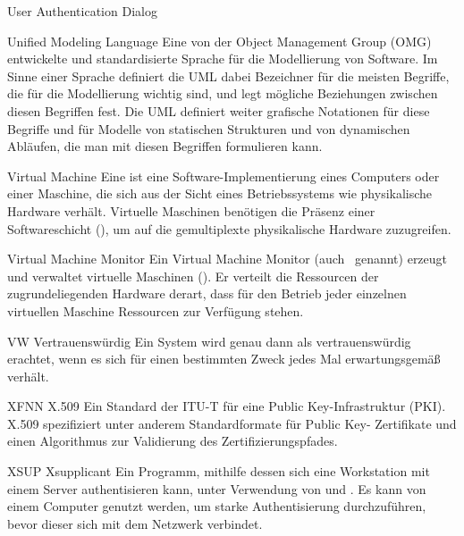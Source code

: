      {User Authentication Dialog}

	{Unified Modeling Language}
	{Eine von der Object Management Group (OMG) entwickelte und 
	 standardisierte Sprache f\"ur die Modellierung von Software. Im Sinne
	 einer Sprache definiert die UML dabei Bezeichner f\"ur die meisten 
	 Begriffe, die f\"ur die Modellierung wichtig sind, und legt m\"ogliche 
	 Beziehungen zwischen diesen Begriffen fest. Die UML definiert weiter 
	 grafische Notationen f\"ur diese Begriffe und f\"ur Modelle von statischen
	 Strukturen und von dynamischen Abl\"aufen, die man mit diesen Begriffen
         formulieren kann.}

	{Virtual Machine}
	{Eine \VM ist eine Software-Implementierung eines Computers oder einer Maschine, die sich aus der Sicht eines Betriebssystems
	 wie physikalische Hardware verhält. Virtuelle Maschinen benötigen die Präsenz einer Softwareschicht (\VMM), um auf die gemultiplexte 
	 physikalische Hardware zuzugreifen.}


	{Virtual Machine Monitor}
	{Ein Virtual Machine Monitor (auch \Hypervisor \, genannt) erzeugt und verwaltet virtuelle Maschinen (\VM). Er verteilt die Ressourcen der zugrundeliegenden Hardware derart, dass für den Betrieb jeder einzelnen virtuellen Maschine Ressourcen zur Verfügung stehen.}

\glosentry
	{VW}
	{Vertrauensw\"urdig}
	{Ein System wird genau dann als vertrauensw\"urdig erachtet, wenn es sich f\"ur einen bestimmten Zweck jedes Mal erwartungsgem\"a\ss{} verh\"alt.}


\glosentry
        {XFNN}
        {X.509}
        {Ein Standard der ITU-T f\"ur eine Public Key-Infrastruktur (PKI).
         X.509 spezifiziert unter anderem Standardformate f\"ur Public Key-
         Zertifikate und einen Algorithmus zur Validierung des
         Zertifizierungspfades.}


\glosentry
        {XSUP}
        {Xsupplicant}
        {Ein Programm, mithilfe dessen sich eine Workstation mit einem
	\RADIUS Server authentisieren kann, unter Verwendung von \SECPORT und
	\EAP. Es kann von einem Computer genutzt werden, um starke 
	Authentisierung durchzuf\"uhren, bevor dieser sich mit dem Netzwerk 
	verbindet.}
